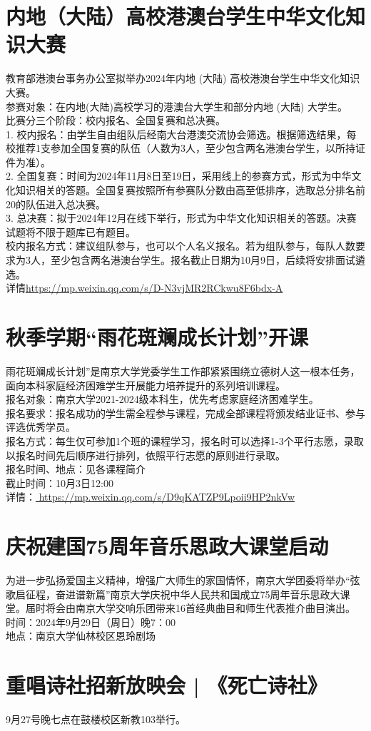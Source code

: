 \documentclass[letterpaper, 12pt]{article}
\begin{document}
\begin{multicols}{2}
\section{内地（大陆）高校港澳台学生中华文化知识大赛}
教育部港澳台事务办公室拟举办2024年内地 (大陆) 高校港澳台学生中华文化知识大赛。\\
参赛对象：在内地(大陆)高校学习的港澳台大学生和部分内地 (大陆) 大学生。 \\
比赛分三个阶段：校内报名、全国复赛和总决赛。\\
1. 校内报名：由学生自由组队后经南大台港澳交流协会筛选。根据筛选结果，每校推荐1支参加全国复赛的队伍（人数为3人，至少包含两名港澳台学生，以所持证件为准）。\\
2. 全国复赛：时间为2024年11月8日至19日，采用线上的参赛方式，形式为中华文化知识相关的答题。全国复赛按照所有参赛队分数由高至低排序，选取总分排名前20的队伍进入总决赛。\\
3. 总决赛：拟于2024年12月在线下举行，形式为中华文化知识相关的答题。决赛试题将不限于题库已有题目。\\
校内报名方式：建议组队参与，也可以个人名义报名。若为组队参与，每队人数要求为3人，至少包含两名港澳台学生。报名截止日期为10月9日，后续将安排面试遴选。\\
详情\url{https://mp.weixin.qq.com/s/D-N3vjMR2RCkwu8F6bdx-A}
\section{秋季学期“雨花斑斓成长计划”开课}
雨花斑斓成长计划”是南京大学党委学生工作部紧紧围绕立德树人这一根本任务，面向本科家庭经济困难学生开展能力培养提升的系列培训课程。\\
报名对象：南京大学2021-2024级本科生，优先考虑家庭经济困难学生。\\
报名要求：报名成功的学生需全程参与课程，完成全部课程将颁发结业证书、参与评选优秀学员。\\
报名方式：每生仅可参加1个班的课程学习，报名时可以选择1-3个平行志愿，录取以报名时间先后顺序进行排列，依照平行志愿的原则进行录取。\\
报名时间、地点：见各课程简介\\
截止时间：10月3日12:00\\
详情：\url{ https://mp.weixin.qq.com/s/D9qKATZP9Lpoii9HP2nkVw}
\section{庆祝建国75周年音乐思政大课堂启动}
为进一步弘扬爱国主义精神，增强广大师生的家国情怀，南京大学团委将举办“弦歌启征程，奋进谱新篇”南京大学庆祝中华人民共和国成立75周年音乐思政大课堂。届时将会由南京大学交响乐团带来16首经典曲目和师生代表推介曲目演出。\\
时间：2024年9月29日（周日）晚7：00\\
地点：南京大学仙林校区恩玲剧场\\
\section{重唱诗社招新放映会 | 《死亡诗社》}
9月27号晚七点在鼓楼校区新教103举行。
\end{multicols} 
\end{document}
